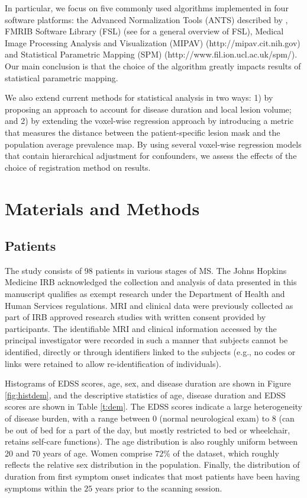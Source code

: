 \documentclass[10pt]{article}
\begin{document}
In particular, we focus on five commonly used algorithms implemented
in four software platforms: the Advanced Normalization Tools (ANTS)
described by \cite{avants2011advanced}, FMRIB Software Library (FSL) (see
\cite{jenkinson2012fsl} for a general overview of FSL), Medical Image
Processing Analysis and Visualization (MIPAV)
(http://mipav.cit.nih.gov) and Statistical Parametric Mapping (SPM) (http://www.fil.ion.ucl.ac.uk/spm/). Our main conclusion is that the choice of the algorithm greatly impacts results of statistical parametric mapping.

We also extend current methods for statistical analysis in two ways: 1) by proposing an approach to account for disease duration
and local lesion volume; and 2) by extending the voxel-wise regression
approach by introducing a metric that measures the distance  between
the patient-specific lesion mask and the population average prevalence map.
By using several voxel-wise regression models that contain
hierarchical adjustment for confounders, we assess the effects of the
choice of registration method on results.



\section*{Materials and Methods}


\subsection*{Patients}

The study consists of 98 patients in various stages of MS. The Johns Hopkins Medicine IRB acknowledged the collection and analysis of data presented in this manuscript qualifies as exempt research under the Department of Health and Human Services regulations.  MRI and clinical data were previously collected as part of IRB approved research studies with written consent provided by participants.  The identifiable MRI and clinical information accessed by the principal investigator were recorded in such a manner that subjects cannot be identified, directly or through identifiers linked to the subjects (e.g., no codes or links were retained to allow re-identification of individuals). 

Histograms of EDSS scores, age, sex, and disease duration are shown in Figure \ref{fig:histdem}, and the descriptive statistics of age, disease duration and EDSS scores are shown in Table \ref{t:dem}. The EDSS scores indicate a large heterogeneity of disease burden, with a range between $0$ (normal neurological exam) to 8 (can be out of bed for a part of the day, but mostly restricted to bed or wheelchair, retains self-care functions). The age distribution is also roughly uniform between 20 and 70 years of age. Women comprise $72$\% of the dataset, which roughly reflects the relative sex distribution in the population. Finally, the distribution of duration from first symptom onset indicates that most patients have been having symptoms within the $25$ years prior to the scanning session.
\end{document}

